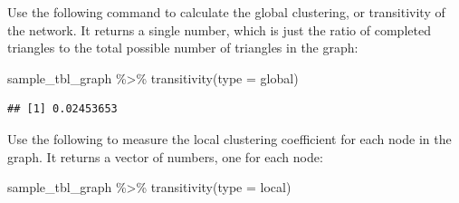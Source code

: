 \documentclass[
]{book}
\newenvironment{Shaded}{\begin{snugshade}}{\end{snugshade}}
\newcommand{\AttributeTok}[1]{\textcolor[rgb]{0.77,0.63,0.00}{#1}}
\newcommand{\FunctionTok}[1]{\textcolor[rgb]{0.00,0.00,0.00}{#1}}
\newcommand{\NormalTok}[1]{#1}
\newcommand{\SpecialCharTok}[1]{\textcolor[rgb]{0.00,0.00,0.00}{#1}}
\newcommand{\StringTok}[1]{\textcolor[rgb]{0.31,0.60,0.02}{#1}}
\begin{document}
Use the following command to calculate the global clustering, or transitivity of the network. It returns a single number, which is just the ratio of completed triangles to the total possible number of triangles in the graph:

\begin{Shaded}
\begin{Highlighting}[]
\NormalTok{sample\_tbl\_graph }\SpecialCharTok{\%\textgreater{}\%} \FunctionTok{transitivity}\NormalTok{(}\AttributeTok{type =} \StringTok{\textquotesingle{}global\textquotesingle{}}\NormalTok{)}
\end{Highlighting}
\end{Shaded}

\begin{verbatim}
## [1] 0.02453653
\end{verbatim}

Use the following to measure the local clustering coefficient for each node in the graph. It returns a vector of numbers, one for each node:

\begin{Shaded}
\begin{Highlighting}[]
\NormalTok{sample\_tbl\_graph }\SpecialCharTok{\%\textgreater{}\%} \FunctionTok{transitivity}\NormalTok{(}\AttributeTok{type =} \StringTok{\textquotesingle{}local\textquotesingle{}}\NormalTok{) }
\end{Highlighting}
\end{Shaded}
\end{document}
